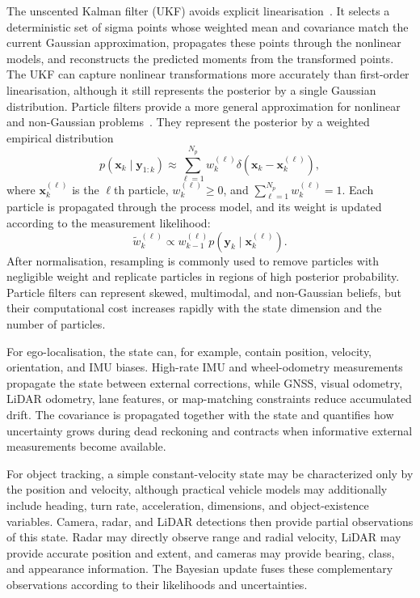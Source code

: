 \documentclass[graybox,envcountchap]{style/SNmono}
\begin{document}
The unscented Kalman filter (UKF) avoids explicit
linearisation~\cite{julier2004_ukf}. It selects a deterministic set of
sigma points whose weighted mean and covariance match the current
Gaussian approximation, propagates these points through the nonlinear
models, and reconstructs the predicted moments from the transformed
points. The UKF can capture nonlinear transformations more accurately
than first-order linearisation, although it still represents the
posterior by a single Gaussian distribution. Particle filters provide a more general approximation for nonlinear and non-Gaussian problems~\cite{gordon1993_pf,arulampalam2002_pf_tutorial}. They represent the posterior by a weighted empirical distribution
\begin{equation}
p(\mathbf{x}_k\mid\mathbf{y}_{1:k})
\approx
\sum_{\ell=1}^{N_p}
w_k^{(\ell)}
\delta\!\left(
\mathbf{x}_k-\mathbf{x}_k^{(\ell)}
\right),
\label{eq:particle_posterior}
\end{equation}
where $\mathbf{x}_k^{(\ell)}$ is the $\ell$th particle,
$w_k^{(\ell)}\geq 0$, and
$\sum_{\ell=1}^{N_p}w_k^{(\ell)}=1$. Each particle is propagated
through the process model, and its weight is updated according to the
measurement likelihood:
\begin{equation}
\widetilde{w}_k^{(\ell)}
\propto
w_{k-1}^{(\ell)}
p\!\left(
\mathbf{y}_k\mid\mathbf{x}_k^{(\ell)}
\right).
\end{equation}
After normalisation, resampling is commonly used to remove particles
with negligible weight and replicate particles in regions of high
posterior probability. Particle filters can represent skewed,
multimodal, and non-Gaussian beliefs, but their computational cost
increases rapidly with the state dimension and the number of particles.




For ego-localisation, the state can, for example, contain position,
velocity, orientation, and IMU biases. High-rate IMU and wheel-odometry measurements propagate the state between external corrections, while GNSS, visual odometry, LiDAR
odometry, lane features, or map-matching constraints reduce accumulated drift. The covariance is propagated together with the state and quantifies how uncertainty grows during dead reckoning and contracts when informative external measurements become available.

For object tracking, a simple constant-velocity state may be characterized only by the position and velocity, although practical vehicle models may additionally include heading, turn rate, acceleration, dimensions, and object-existence variables. Camera, radar, and LiDAR detections then provide partial observations of this state. Radar may directly observe range and radial velocity, LiDAR may provide accurate position and extent, and cameras may provide bearing, class, and appearance information. The Bayesian update fuses these complementary observations according to their likelihoods and uncertainties.
\end{document}
